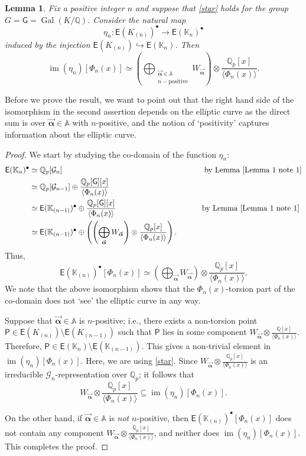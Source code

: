 \documentclass{amsart}
\newtheorem{lemma}[theorem]{Lemma}
\numberwithin{equation}{section}
\theoremstyle{remark}
\newcommand{\val}{\vec{\boldsymbol{\alpha}}}
\newcommand{\EC}{\mathsf{E}}
\newcommand{\cG}{\mathcal{G}}
\newcommand{\Gal}{\operatorname{Gal}}
\newcommand{\Qp}{\mathbb{Q}_p}
\newcommand{\sG}{\mathsf{G}}
\newcommand{\Kn}{\mathbb{K}_{n}}
\newcommand{\K}{\mathbb{K}}
\newcommand{\A}{\mathbb{A}}
\newcommand{\Q}{\mathbb{Q}}
\newcommand{\image}{\operatorname{im}}
\theoremstyle{plain} %
\begin{document}
\begin{lemma}
\label{lemma 3 note 1}
Fix a positive integer $n$ and suppose that \ref{star} holds for the group $G = \sG = \Gal(K/\Q)$.
Consider the natural map
\[
\eta_n : \EC(K_{(n)})^{\bullet} \longrightarrow \EC(\Kn)^{\bullet}
\]
induced by the injection $\EC(K_{(n)})\hookrightarrow \EC(\Kn)$.
Then
\[
\image(\eta_n)[\Phi_n(x)] \simeq \left( \bigoplus_{\substack{\val\in \A\\
n-\text{positive}}} W_{\val}\right) \otimes  \frac{\Qp[x]}{\langle \Phi_n(x)\rangle}.
\]
\end{lemma}

Before we prove the result, we want to point out that the right hand side of the isomorphism in the second assertion depends on the elliptic curve as the direct sum is over $\val\in \A$ with $n$-positive, and the notion of `positivity' captures information about the elliptic curve.

\begin{proof}
We start by studying the co-domain of the function $\eta_n$: 
\begin{align*}
\EC(\Kn)^{\bullet} & \simeq \Qp[\cG_n] \hspace{2.5in} \text{ by Lemma~\ref{Lemma 1 note 1}}\\
& \simeq \Qp[\cG_{n-1}] \oplus \frac{\Qp[\sG][x]}{\langle \Phi_n(x)\rangle}\\ 
& \simeq \EC(\K_{(n-1)})^{\bullet} \oplus \frac{\Qp[\sG][x]}{\langle \Phi_n(x)\rangle} \hspace{1.5in} \text{ by Lemma~\ref{Lemma 1 note 1}} \\
&\simeq \EC(\K_{(n-1)})^{\bullet} \oplus \left( \left(\bigoplus_{\val} W_{\val}\right) \otimes \frac{\Qp[x]}{\langle \Phi_n(x)\rangle}\right).
\end{align*}
Thus,
\[
\EC(\K_{(n)})^{\bullet}[\Phi_n(x)] \simeq \left(\bigoplus_{\val} W_{\val}\right) \otimes \frac{\Qp[x]}{\langle \Phi_n(x)\rangle}.
\]
We note that the above isomorphism shows that the $\Phi_n(x)$-torsion part of the co-domain does not `see' the elliptic curve in any way.

Suppose that $\val\in \A$ is $n$-positive; i.e., there exists a non-torsion point $\mathsf{P}\in \EC(K_{(n)})\setminus \EC(K_{(n-1)})$ such that $\mathsf{P}$ lies in some component $W_{\val} \otimes \frac{\Q[x]}{\langle \Phi_n(x)\rangle}$.
Therefore, $\mathsf{P}\in \EC(\Kn)\setminus \EC(\K_{(n-1)})$.
This gives a non-trivial element in $\image(\eta_n)[\Phi_n(x)]$.
Here, we are using \ref{star}.
Since $W_{\val} \otimes \frac{\Qp[x]}{\langle \Phi_n(x)\rangle}$ is an irreducible $\cG_n$-representation over $\Qp$; it follows that
\[
W_{\val} \otimes \frac{\Qp[x]}{\langle \Phi_n(x)\rangle} \subseteq \image(\eta_n)[\Phi_n(x)].
\]

On the other hand, if $\val\in \A$ is \emph{not} $n$-positive, then $\EC(\K_{(n)})^{\bullet}[\Phi_n(x)]$ does not contain any component $W_{\val} \otimes \frac{\Qp[x]}{\langle \Phi_n(x)\rangle}$, and neither does $\image(\eta_n)[\Phi_n(x)]$.
This completes the proof.
\end{proof}
\end{document}
